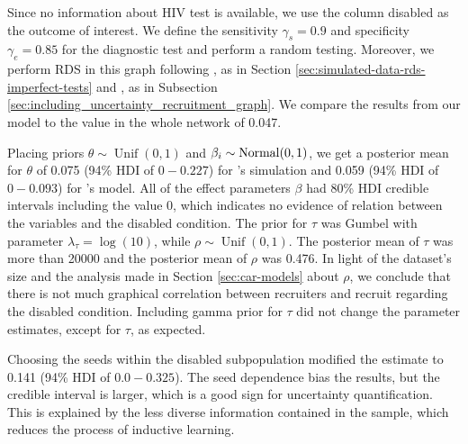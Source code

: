 Since no information about HIV test is available, we use the
column disabled as the outcome of interest. We define the sensitivity
$\gamma_s = 0.9$ and specificity $\gamma_e = 0.85$ for the diagnostic test and
perform a random testing. Moreover, we perform
RDS in this graph following \textcite{baraff2016estimating}, as in Section
\ref{sec:simulated-data-rds-imperfect-tests} and \textcite{crawford2016}, as
in Subsection \ref{sec:including_uncertainty_recruitment_graph}. We compare
the results from our model to the value in the whole network of 0.047. 

Placing priors $\theta \sim \operatorname{Unif}(0,1)$ and $\beta_i \sim
\operatorname{Normal}(0,1)$, we get a posterior mean for $\theta$ of 0.075 (94\% HDI of $0 -
0.227$) for \textcite{baraff2016estimating}'s simulation and 
0.059 (94\% HDI of $0 - 0.093$) for \textcite{crawford2016}'s model.
All of the effect parameters $\beta$ had 80\% HDI credible intervals
including the value $0$, which indicates no evidence of relation between the variables and
the disabled condition. The prior for $\tau$ was Gumbel with parameter
$\lambda_{\tau} = \log(10)$, while $\rho \sim \operatorname{Unif}(0,1)$. The
posterior mean of $\tau$ was more than 20000 and the posterior mean of $\rho$
was 0.476. In light of the dataset's size and the analysis made in Section
\ref{sec:car-models} about $\rho$, we conclude that there is not much graphical correlation
between recruiters and recruit regarding the disabled condition. Including
gamma prior for $\tau$ did not change the parameter estimates, except for
$\tau$, as expected.

Choosing the seeds within the disabled subpopulation modified the estimate to
0.141 (94\% HDI of $0.0 - 0.325$). The seed dependence bias the results, but
the credible interval is larger, which is a good sign for uncertainty
quantification. This is explained by the less diverse information contained in
the sample, which reduces the process of inductive learning. 